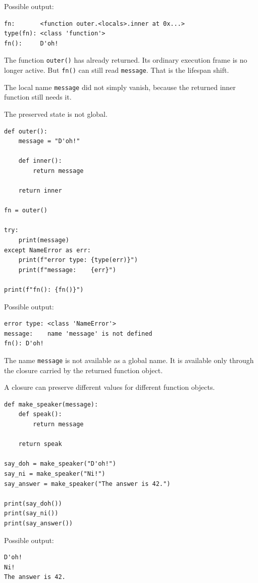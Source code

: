 Possible output:

\begin{verbatim}
fn:       <function outer.<locals>.inner at 0x...>
type(fn): <class 'function'>
fn():     D'oh!
\end{verbatim}

The function \texttt{outer()} has already returned. Its ordinary execution frame is no longer active. But \texttt{fn()} can still read \texttt{message}. That is the lifespan shift.

The local name \texttt{message} did not simply vanish, because the returned inner function still needs it.

The preserved state is not global.

\begin{verbatim}
def outer():
    message = "D'oh!"

    def inner():
        return message

    return inner

fn = outer()

try:
    print(message)
except NameError as err:
    print(f"error type: {type(err)}")
    print(f"message:    {err}")

print(f"fn(): {fn()}")
\end{verbatim}

Possible output:

\begin{verbatim}
error type: <class 'NameError'>
message:    name 'message' is not defined
fn(): D'oh!
\end{verbatim}

The name \texttt{message} is not available as a global name. It is available only through the closure carried by the returned function object.

A closure can preserve different values for different function objects.

\begin{verbatim}
def make_speaker(message):
    def speak():
        return message

    return speak

say_doh = make_speaker("D'oh!")
say_ni = make_speaker("Ni!")
say_answer = make_speaker("The answer is 42.")

print(say_doh())
print(say_ni())
print(say_answer())
\end{verbatim}

Possible output:

\begin{verbatim}
D'oh!
Ni!
The answer is 42.
\end{verbatim}

